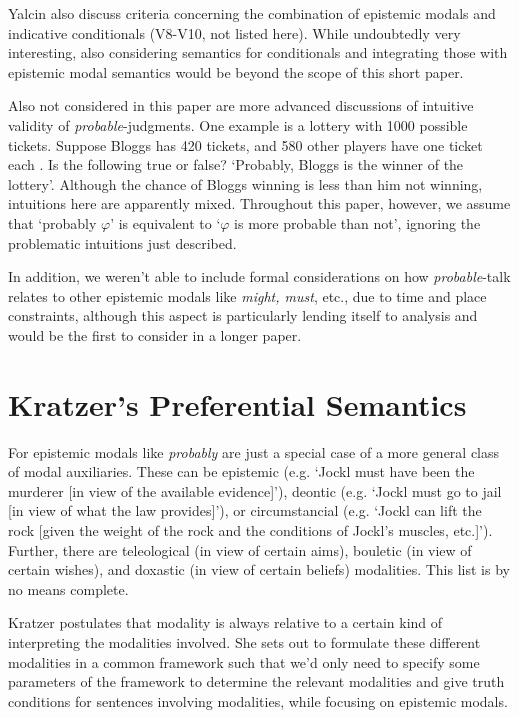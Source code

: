 \documentclass{article}
\theoremstyle{definition}
\begin{document}
Yalcin also discuss criteria concerning the combination of epistemic modals and indicative conditionals (V8-V10, not listed here). While undoubtedly very interesting, also considering semantics for conditionals and integrating those with epistemic modal semantics would be beyond the scope of this short paper.

Also not considered in this paper are more advanced discussions of intuitive validity of \emph{probable}-judgments. One example is a lottery with 1000 possible tickets.
Suppose Bloggs has 420 tickets, and 580 other players have one ticket each \parencite[p.~931]{yalcin10_probab_operat}. Is the following true or false?
`Probably, Bloggs is the winner of the lottery'. Although the chance of Bloggs winning is less than him not winning, intuitions here are apparently mixed. Throughout this paper, however, we assume that `probably $\varphi$' is equivalent to `$\varphi$ is more probable than not', ignoring the problematic intuitions just described.

In addition, we weren't able to include formal considerations on how \emph{probable}-talk relates to other epistemic modals like \emph{might, must}, etc., due to time and place constraints, although this aspect is particularly lending itself to analysis and would be the first to consider in a longer paper.

\section{Kratzer's Preferential Semantics}

For \textcite{kratzer91_modal} epistemic modals like \emph{probably} are just a special case of a more general class of modal auxiliaries.
These can be epistemic (e.g. `Jockl must have been the murderer [in view of the available evidence]'), deontic (e.g. `Jockl must go to jail [in view of what the law provides]'), or circumstancial (e.g. `Jockl can lift the rock [given the weight of the rock and the conditions of Jockl's muscles, etc.]').
Further, there are teleological (in view of certain aims), bouletic (in view of certain wishes), and doxastic (in view of certain beliefs) modalities.
This list is by no means complete.

Kratzer postulates that modality is always relative to a certain kind of interpreting the modalities involved.
She sets out to formulate these different modalities in a common framework such that we'd only need to specify some parameters of the framework to determine the relevant modalities and give truth conditions for sentences involving modalities, while focusing on epistemic modals.
\end{document}
